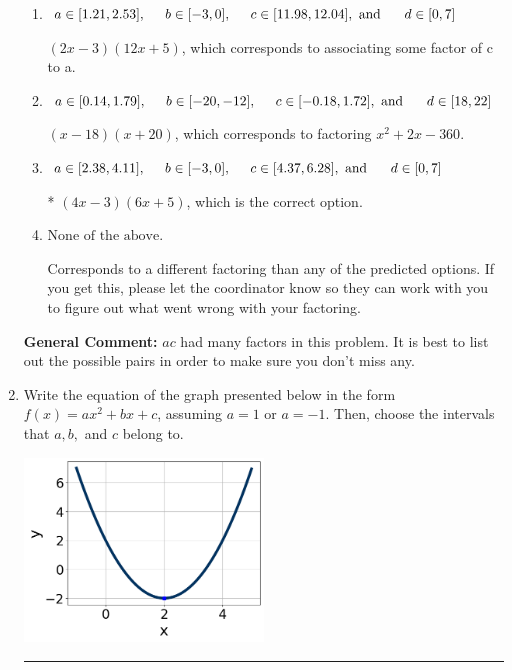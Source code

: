 \documentclass{extbook}[14pt]
\newcommand{\litem}[1]{\item #1

\rule{\textwidth}{0.4pt}}
\begin{document}
\begin{enumerate}
{\begin{enumerate}[label=\Alph*.]
 $(12x -3)(2x + 5)$, which corresponds to associating some factor of a to c.
\item \( a \in [1.21, 2.53], \hspace*{5mm} b \in [-3, 0], \hspace*{5mm} c \in [11.98, 12.04], \text{ and } \hspace*{5mm} d \in [0, 7] \)

 $(2x -3)(12x + 5)$, which corresponds to associating some factor of c to a.
\item \( a \in [0.14, 1.79], \hspace*{5mm} b \in [-20, -12], \hspace*{5mm} c \in [-0.18, 1.72], \text{ and } \hspace*{5mm} d \in [18, 22] \)

 $(x -18)(x + 20)$, which corresponds to factoring $x^{2} +2 x -360$.
\item \( a \in [2.38, 4.11], \hspace*{5mm} b \in [-3, 0], \hspace*{5mm} c \in [4.37, 6.28], \text{ and } \hspace*{5mm} d \in [0, 7] \)

* $(4x -3)(6x + 5)$, which is the correct option.
\item \( \text{None of the above.} \)

 Corresponds to a different factoring than any of the predicted options. If you get this, please let the coordinator know so they can work with you to figure out what went wrong with your factoring.
\end{enumerate}

\textbf{General Comment:} $ac$ had many factors in this problem. It is best to list out the possible pairs in order to make sure you don't miss any.
}
\litem{
Write the equation of the graph presented below in the form $f(x)=ax^2+bx+c$, assuming  $a=1$ or $a=-1$. Then, choose the intervals that $a, b,$ and $c$ belong to.

\begin{center}
    \includegraphics[width=0.5\textwidth]{../Figures/quadraticGraphToEquationCopyA.png}
\end{center}


}
\end{enumerate}
\end{document}
